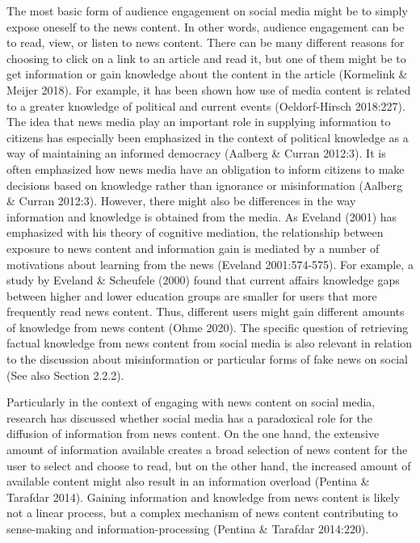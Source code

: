 \documentclass[
]{article}
\begin{document}
\noindent The most basic form of audience engagement on social media
might be to simply expose oneself to the news content. In other words,
audience engagement can be to read, view, or listen to news content.
There can be many different reasons for choosing to click on a link to
an article and read it, but one of them might be to get information or
gain knowledge about the content in the article (Kormelink \& Meijer
2018). For example, it has been shown how use of media content is
related to a greater knowledge of political and current events
(Oeldorf-Hirsch 2018:227). The idea that news media play an important
role in supplying information to citizens has especially been emphasized
in the context of political knowledge as a way of maintaining an
informed democracy (Aalberg \& Curran 2012:3). It is often emphasized
how news media have an obligation to inform citizens to make decisions
based on knowledge rather than ignorance or misinformation (Aalberg \&
Curran 2012:3). However, there might also be differences in the way
information and knowledge is obtained from the media. As Eveland (2001)
has emphasized with his theory of cognitive mediation, the relationship
between exposure to news content and information gain is mediated by a
number of motivations about learning from the news (Eveland
2001:574-575). For example, a study by Eveland \& Scheufele (2000) found
that current affairs knowledge gaps between higher and lower education
groups are smaller for users that more frequently read news content.
Thus, different users might gain different amounts of knowledge from
news content (Ohme 2020). The specific question of retrieving factual
knowledge from news content from social media is also relevant in
relation to the discussion about misinformation or particular forms of
fake news on social (See also Section 2.2.2).

Particularly in the context of engaging with news content on social
media, research has discussed whether social media has a paradoxical
role for the diffusion of information from news content. On the one
hand, the extensive amount of information available creates a broad
selection of news content for the user to select and choose to read, but
on the other hand, the increased amount of available content might also
result in an information overload (Pentina \& Tarafdar 2014). Gaining
information and knowledge from news content is likely not a linear
process, but a complex mechanism of news content contributing to
sense-making and information-processing (Pentina \& Tarafdar 2014:220).
\end{document}
